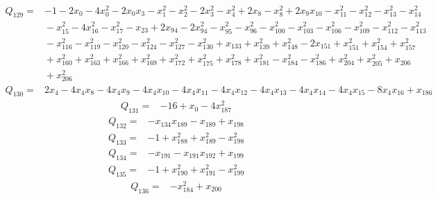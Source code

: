 {\begin{align*}
\end{align*}
\begin{align*}
 Q_{129}={}&-1 -2x_{0} -4x_{0}^{2} -2x_{0}x_{3} -x_{1}^{2} -x_{2}^{2} -2x_{3}^{2} -x_{4}^{2} +2x_{8} -x_{8}^{2} +2x_{9}x_{10} -x_{11}^{2} -x_{12}^{2} -x_{13}^{2} -x_{14}^{2}\\
 &{}-x_{15}^{2} -4x_{16}^{2} -x_{17}^{2} -x_{23} +2x_{94} -2x_{94}^{2} -x_{95}^{2} -x_{96}^{2} -x_{100}^{2} -x_{103}^{2} -x_{106}^{2} -x_{109}^{2} -x_{112}^{2} -x_{113}^{2}\\
 &{}-x_{116}^{2} -x_{119}^{2} -x_{120}^{2} -x_{124}^{2} -x_{127}^{2} -x_{130}^{2} +x_{133} +x_{139}^{2} +x_{148}^{2} -2x_{151} +x_{151}^{2} +x_{154}^{2} +x_{157}^{2}\\
 &{}+x_{160}^{2} +x_{163}^{2} +x_{166}^{2} +x_{169}^{2} +x_{172}^{2} +x_{175}^{2} +x_{178}^{2} +x_{181}^{2} -x_{184}^{2} -x_{186}^{2} +x_{204}^{2} +x_{205}^{2} +x_{206}\\
 &{}+x_{206}^{2}
\end{align*}
\begin{align*}
 Q_{130}={}&2x_{4} -4x_{4}x_{8} -4x_{4}x_{9} -4x_{4}x_{10} -4x_{4}x_{11} -4x_{4}x_{12} -4x_{4}x_{13} -4x_{4}x_{14} -4x_{4}x_{15} -8x_{4}x_{16} +x_{186}
\end{align*}
\begin{align*}
 Q_{131}={}&-16 +x_{0} -4x_{187}^{2}
\end{align*}
\begin{align*}
 Q_{132}={}&-x_{134}x_{189} -x_{189} +x_{198}
\end{align*}
\begin{align*}
 Q_{133}={}&-1 +x_{188}^{2} +x_{189}^{2} -x_{198}^{2}
\end{align*}
\begin{align*}
 Q_{134}={}&-x_{191} -x_{191}x_{192} +x_{199}
\end{align*}
\begin{align*}
 Q_{135}={}&-1 +x_{190}^{2} +x_{191}^{2} -x_{199}^{2}
\end{align*}
\begin{align*}
 Q_{136}={}&-x_{184}^{2} +x_{200}
\end{align*}
\begin{align*}

\end{align*}}
